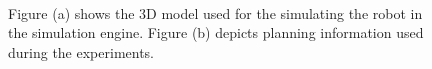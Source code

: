 \begin{figure}[thpb]
     \footnotesize
      \centering
      \myfloatalign
      \setlength\fboxsep{0pt}
      \setlength\fboxrule{0.5pt}
       \\
       \caption[Simulation: artificial environment]{Figure (a) shows the 3D model used for the simulating the robot in the simulation engine. Figure (b) depicts planning information used during the experiments.}
      \label{fig:gazebo_v4r}
   \end{figure}

